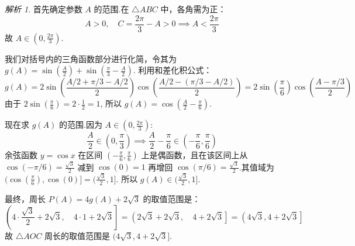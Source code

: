 \documentclass[12pt,a4paper]{ctexbook}
\theoremstyle{definition}
\theoremstyle{remark}
\newtheorem*{solution}{解析}
\begin{document}
\begin{solution}
		首先确定参数 $A$ 的范围.在 $\triangle ABC$ 中，各角需为正：
		\[
		A>0, \quad C = \frac{2\pi}{3}-A > 0 \implies A < \frac{2\pi}{3}
		\]
		故 $A \in (0, \frac{2\pi}{3})$.
		
		我们对括号内的三角函数部分进行化简，令其为 $g(A) = \sin(\frac{A}{2}) + \sin(\frac{\pi}{3}-\frac{A}{2})$.
		利用和差化积公式：
		\[
		g(A) = 2\sin\left(\frac{A/2 + \pi/3-A/2}{2}\right)\cos\left(\frac{A/2 - (\pi/3-A/2)}{2}\right) = 2\sin\left(\frac{\pi}{6}\right)\cos\left(\frac{A-\pi/3}{2}\right)
		\]
		由于 $2\sin(\frac{\pi}{6}) = 2 \cdot \frac{1}{2} = 1$, 所以 $g(A) = \cos\left(\frac{A}{2}-\frac{\pi}{6}\right)$.
		
		现在求 $g(A)$ 的范围.因为 $A \in (0, \frac{2\pi}{3})$:
		\[
		\frac{A}{2} \in \left(0, \frac{\pi}{3}\right) \implies \frac{A}{2}-\frac{\pi}{6} \in \left(-\frac{\pi}{6}, \frac{\pi}{6}\right)
		\]
		余弦函数 $y=\cos x$ 在区间 $(-\frac{\pi}{6}, \frac{\pi}{6})$ 上是偶函数，且在该区间上从 $\cos(-\pi/6)=\frac{\sqrt{3}}{2}$ 减到 $\cos(0)=1$ 再增回 $\cos(\pi/6)=\frac{\sqrt{3}}{2}$.其值域为 $(\cos(\frac{\pi}{6}), \cos(0)] = (\frac{\sqrt{3}}{2}, 1]$.
		所以 $g(A) \in (\frac{\sqrt{3}}{2}, 1]$.
		
		最终，周长 $P(A) = 4g(A) + 2\sqrt{3}$ 的取值范围是：
		\[
		\left(4 \cdot \frac{\sqrt{3}}{2} + 2\sqrt{3}, \quad 4 \cdot 1 + 2\sqrt{3}\right] = \left(2\sqrt{3} + 2\sqrt{3}, \quad 4 + 2\sqrt{3}\right] = \left(4\sqrt{3}, 4+2\sqrt{3}\right]
		\]
		故 $\triangle AOC$ 周长的取值范围是 $(4\sqrt{3}, 4+2\sqrt{3}]$.\hfill\qedsymbol
	\end{solution}
	
\end{document}
